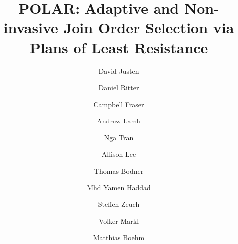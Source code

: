\documentclass[sigconf,nonacm,pdfa,screen]{acmart}
\begin{document}
\title{POLAR: Adaptive and Non-invasive Join Order Selection via Plans of Least Resistance}

\author{David Justen}

\author{Daniel Ritter}

\author{Campbell Fraser}

\author{Andrew Lamb}
\author{Nga Tran}

\author{Allison Lee}

\author{Thomas Bodner}

\author{Mhd Yamen Haddad}

\author{Steffen Zeuch}
\author{Volker Markl}

\author{Matthias Boehm}
\end{document}
